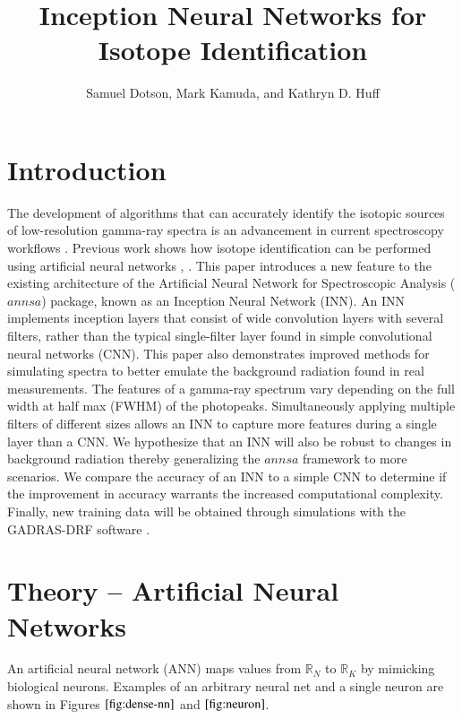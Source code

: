 \documentclass[fleqn]{anstrans}
\title{Inception Neural Networks for Isotope Identification}
\author{Samuel Dotson, Mark Kamuda, and Kathryn D. Huff}
\institute{
Dept. of Nuclear, Plasma and Radiological Engineering, University of Illinois at Urbana-Champaign \\
sgd2@illinois.edu
}
\begin{document}

\section{Introduction}
The development of algorithms that can accurately identify the isotopic sources of low-resolution gamma-ray 
spectra is an advancement in current spectroscopy workflows \cite{rawool-sullivanStepsAutomatedGamma2010}.
Previous work shows how isotope identification can be performed using artificial neural networks \cite{kamudaAutomatedIsotopeIdentification2017} \cite{kamudaComparisonMachineLearning2018a}, \cite{kamudaMachineLearningApproach2018}. 
This paper introduces a new feature to the existing architecture of the Artificial Neural Network for Spectroscopic Analysis ($\textit{annsa}$) package, known as an Inception Neural Network (INN). 
An INN implements inception layers that consist of wide convolution layers with several filters, rather than the typical single-filter layer found in simple convolutional neural networks (CNN).
This paper also demonstrates improved methods for simulating spectra to better emulate the background radiation found in real measurements. 
The features of a gamma-ray spectrum vary depending on the full width at half max (FWHM) of the photopeaks. 
Simultaneously applying multiple filters of different sizes allows an INN to capture more features during a single layer than a CNN. 
We hypothesize that an INN will also be robust to changes in background radiation thereby generalizing the $\textit{annsa}$ framework to more scenarios. 
We compare the accuracy of an INN to a simple CNN to determine if the improvement in accuracy warrants the increased computational complexity. 
Finally, new training data will be obtained through simulations with the GADRAS-DRF software \cite{mitchellGADRASIsotopeID2014}.

\section{Theory -- Artificial Neural Networks}

An artificial neural network (ANN) maps values from ${\mathbb{R}}_{N}$ to ${\mathbb{R}}_{K}$ by mimicking biological 
neurons. Examples of an arbitrary neural net and a single neuron are shown in Figures $\ref{fig:dense-nn}$ and $\ref{fig:neuron}$. 
\end{document}
